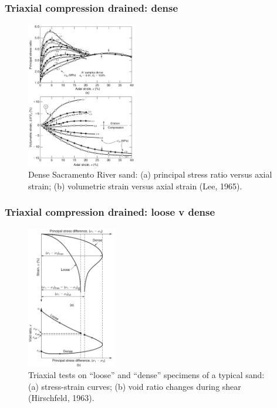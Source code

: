 \documentclass[notes]{beamer}
\begin{document}
\begin{frame}
\frametitle{Triaxial compression drained: dense}
\begin{figure}
	\includegraphics[width=0.43\textwidth]{figs/tx-drained-dense.png}
	\caption*{Dense Sacramento River sand: (a) principal stress ratio versus
		axial strain; (b) volumetric strain versus axial strain (Lee, 1965).}
\end{figure}
\end{frame}

\begin{frame}
\frametitle{Triaxial compression drained: loose v dense}
\begin{figure}
	\includegraphics[width=0.35\textwidth]{figs/tx-drained-loose-dense.png}
	\caption*{Triaxial tests on “loose” and “dense” specimens of a typical sand: (a) stress-strain curves; (b) void
		ratio changes during shear (Hirschfeld, 1963).}
\end{figure}
\end{frame}
\end{document}
